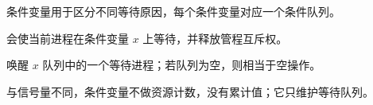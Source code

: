 \begin{points}
  \item 条件变量用于区分不同等待原因，每个条件变量对应一个条件队列。
  \item {} 会使当前进程在条件变量 $x$ 上等待，并释放管程互斥权。
  \item {} 唤醒 $x$ 队列中的一个等待进程；若队列为空，则相当于空操作。
  \item 与信号量不同，条件变量不做资源计数，没有累计值；它只维护等待队列。
\end{points}

